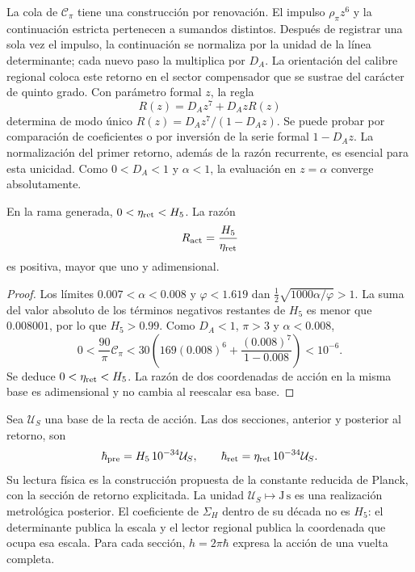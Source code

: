La cola de \(\mathcal C_\pi\) tiene una construcción por renovación.
El impulso \(\rho_\pi z^6\) y la continuación estricta pertenecen
a sumandos distintos. Después de registrar una sola vez el impulso,
la continuación se normaliza por la unidad de la línea determinante;
cada nuevo paso la multiplica por \(D_A\). La orientación del
calibre regional coloca este retorno en el sector compensador que
se sustrae del carácter de quinto grado.
Con parámetro formal \(z\), la regla
\begin{equation}
 R(z)=D_Az^7+D_AzR(z)
 \label{vi:dep:renovacion}
\end{equation}
determina de modo único
\(R(z)=D_Az^7/(1-D_Az)\). Se puede probar por comparación de
coeficientes o por inversión de la serie formal \(1-D_Az\).
La normalización del primer retorno, además de la razón recurrente,
es esencial para esta unicidad. Como \(0<D_A<1\) y \(\alpha<1\),
la evaluación en \(z=\alpha\) converge absolutamente.

\begin{proposition}
\label{vi:dep:positividad-accion}
En la rama generada, \(0<\eta_{\rm ret}<H_5\). La razón
\begin{equation}
 R_{\rm act}=\frac{H_5}{\eta_{\rm ret}}
 \label{vi:dep:Ract}
\end{equation}
es positiva, mayor que uno y adimensional.
\end{proposition}
\begin{proof}
Los límites \(0.007<\alpha<0.008\) y \(\varphi<1.619\) dan
\(\tfrac12\sqrt{1000\alpha/\varphi}>1\). La suma del valor absoluto
de los términos negativos restantes de \(H_5\) es menor que
\(0.008001\), por lo que \(H_5>0.99\).
Como \(D_A<1\), \(\pi>3\) y \(\alpha<0.008\),
\[
 0<\frac{90}{\pi}\mathcal C_\pi
 <30\left(169(0.008)^6+
                  \frac{(0.008)^7}{1-0.008}\right)<10^{-6}.
\]
Se deduce \(0<\eta_{\rm ret}<H_5\). La razón de dos coordenadas
de acción en la misma base es adimensional y no cambia al reescalar
esa base.
\end{proof}

Sea \(\mathcal U_S\) una base de la recta de acción. Las dos
secciones, anterior y posterior al retorno, son
\begin{equation}
 \hbar_{\rm pre}=H_5\,10^{-34}\mathcal U_S,
 \qquad
 \hbar_{\rm ret}=\eta_{\rm ret}\,10^{-34}\mathcal U_S.
 \label{vi:dep:hbar}
\end{equation}
Su lectura física es la construcción propuesta de la constante reducida
de Planck, con la sección de retorno explicitada. La unidad
\(\mathcal U_S\mapsto\mathrm{J\,s}\) es una realización metrológica
posterior. El coeficiente de \(\Sigma_H\) dentro de su década no es
\(H_5\): el determinante publica la escala y el lector regional
publica la coordenada que ocupa esa escala. Para cada sección,
\(h=2\pi\hbar\) expresa la acción de una vuelta completa.

